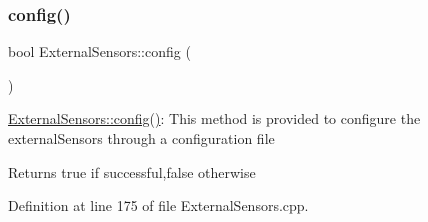 \subsubsection{\texorpdfstring{config()}{config()}\hspace{0.1cm}{\footnotesize\ttfamily [1/2]}}
{\footnotesize\ttfamily bool External\+Sensors\+::config (\begin{DoxyParamCaption}{ }\end{DoxyParamCaption})}

\hyperlink{class_external_sensors_a862a4bd11346b37270d0244c2adabe5a}{External\+Sensors\+::config()}\+: This method is provided to configure the external\+Sensors through a configuration file

\begin{DoxyReturn}{Returns}
true if successful,false otherwise 
\end{DoxyReturn}


Definition at line 175 of file External\+Sensors.\+cpp.


